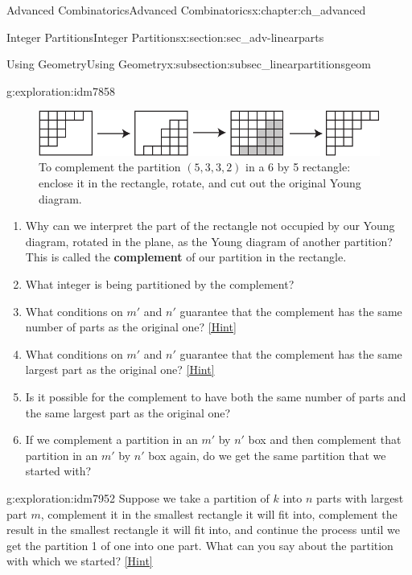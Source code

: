 \documentclass[oneside,10pt,]{book}
\newcommand{\terminology}[1]{\textbf{#1}}
\numberwithin{equation}{chapter}
\begin{document}
\begin{chapterptx}{Advanced Combinatorics}{}{Advanced Combinatorics}{}{}{x:chapter:ch_advanced}
\begin{sectionptx}{Integer Partitions}{}{Integer Partitions}{}{}{x:section:sec_adv-linearparts}
\begin{subsectionptx}{Using Geometry}{}{Using Geometry}{}{}{x:subsection:subsec_linearpartitionsgeom}
\begin{introduction}{}
\begin{exploration}{}{g:exploration:idm7858}
\begin{figure}
\centering
\includegraphics[width=0.7\linewidth]{images/complementpartition}
\caption{To complement the partition \((5,3,3,2)\) in a 6 by 5 rectangle: enclose it in the rectangle, rotate, and cut out the original Young diagram.\label{x:figure:complementpartition}}
\end{figure}
\begin{enumerate}[font=\bfseries,label=(\alph*),ref=\alph*]
\item{}Why can we interpret the part of the rectangle not occupied by our Young diagram, rotated in the plane, as the Young diagram of another partition? This is called the \terminology{complement} of our partition in the rectangle.%
\item{}What integer is being partitioned by the complement?%
\item{}What conditions on \(m'\) and \(n'\) guarantee that the complement has the same number of parts as the original one?%
\space\hspace*{0pt}\hfill{\tiny\hyperlink{g:hint:idm7895-back}{[Hint]}}\item{}What conditions on \(m'\) and \(n'\) guarantee that the complement has the same largest part as the original one?%
\space\hspace*{0pt}\hfill{\tiny\hyperlink{g:hint:idm7912-back}{[Hint]}}\item{}Is it possible for the complement to have both the same number of parts and the same largest part as the original one?%
\item{}If we complement a partition in an \(m'\) by \(n'\) box and then complement that partition in an \(m'\) by \(n'\) box again, do we get the same partition that we started with?%
\end{enumerate}
\end{exploration}
\begin{exploration}{}{g:exploration:idm7952}%
Suppose we take a partition of \(k\) into \(n\) parts with largest part \(m\), complement it in the smallest rectangle it will fit into, complement the result in the smallest rectangle it will fit into, and continue the process until we get the partition 1 of one into one part.  What can you say about the partition with which we started?%
\space\hspace*{0pt}\hfill{\tiny\hyperlink{g:hint:idm7958-back}{[Hint]}}\end{exploration}

\end{introduction}
\end{subsectionptx}
\end{sectionptx}
\end{chapterptx}
\end{document}
